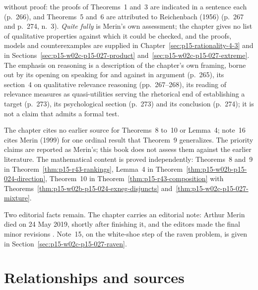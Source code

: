 \begin{enumerate}
  without proof: the proofs of Theorems~1 and~3 are indicated in a
  sentence each (p.~266), and Theorems~5 and~6 are attributed to
  Reichenbach (1956) (p.~267 and p.~274, n.~3). \emph{Quite fully} is
  Merin's own assessment; the chapter gives no list of qualitative
  properties against which it could be checked, and the proofs, models
  and counterexamples are supplied in
  Chapter~\ref{sec:p15-rationality-4-3} and in
  Sections~\ref{sec:p15-w02c-p15-027-product}
  and~\ref{sec:p15-w02c-p15-027-extreme}. The emphasis on reasoning is a
  description of the chapter's own framing, borne out by its opening on
  speaking for and against in argument (p.~265), its section~4 on
  qualitative relevance reasoning (pp.~267--268), its reading of
  relevance measures as quasi-utilities serving the rhetorical end of
  establishing a target (p.~273), its psychological section (p.~273) and
  its conclusion (p.~274); it is not a claim that admits a formal test.
\end{enumerate}
The chapter cites no earlier source for Theorems~8 to~10 or Lemma~4;
note~16 cites Merin (1999) for one ordinal result that Theorem~9
generalizes. The priority claims are reported as Merin's; this book
does not assess them against the earlier literature. The mathematical
content is proved independently: Theorems~8 and~9 in
Theorem~\ref{thm:p15-r43-rankings}, Lemma~4 in
Theorem~\ref{thm:p15-w02b-p15-024-direction}, Theorem~10 in
Theorem~\ref{thm:p15-r43-composition} with
Theorems~\ref{thm:p15-w02b-p15-024-exneg-disjuncts}
and~\ref{thm:p15-w02c-p15-027-mixture}.

Two editorial facts remain. The chapter carries an
editorial note: Arthur Merin died on 24 May 2019, shortly after
finishing it, and the editors made the final minor revisions
\cite[p.~274]{Merin2021Relevance}. Note~15, on the white-shoe step of
the raven problem, is given in Section~\ref{sec:p15-w02c-p15-027-raven}.

\section{Relationships and sources}
\label{sec:p15-w02c-p15-027-relationships}

